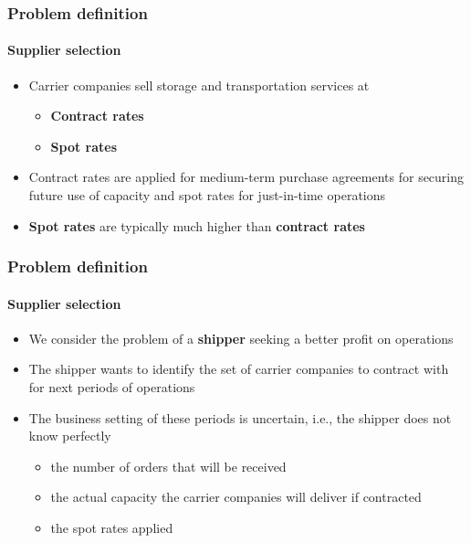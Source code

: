 \documentclass[,9pt,xcolor={dvipsnames}]{beamer} %
\begin{document}
\begin{frame}%
	\frametitle{Problem definition}
	\framesubtitle{Supplier selection}
	\begin{itemize}
		\item<1-> Carrier companies sell storage and transportation services at
		\bigskip
		\begin{itemize}
			\item<1-> \textbf{Contract rates}
			\medskip
			\item<2-> \textbf{Spot rates}
		\end{itemize}
		\bigskip
		\item<3-> Contract rates are applied for medium-term purchase agreements for securing future use of capacity and spot rates for just-in-time operations
		\bigskip
		\item<4-> \textbf{\color{purple} Spot rates} are typically much higher than \textbf{\color{blue} contract rates}
	\end{itemize}
\end{frame}

\begin{frame}%
	\frametitle{Problem definition}
	\framesubtitle{Supplier selection}
	\begin{itemize}
		\item<1-> We consider the problem of a \textbf{shipper} seeking a better profit on operations 
		\bigskip
		\item<2-> The shipper wants to identify the set of carrier companies to contract with for next periods of operations
		\bigskip
		\item<3-> The business setting of these periods is uncertain, i.e., the shipper does not know perfectly
		\bigskip
		\begin{itemize}
			\item<3-> the number of orders that will be received
			\bigskip
			\item<4-> the actual capacity the carrier companies will deliver if contracted
			\bigskip
			\item<5-> the spot rates applied
		\end{itemize}
	\end{itemize}
\end{frame}
\end{document}
